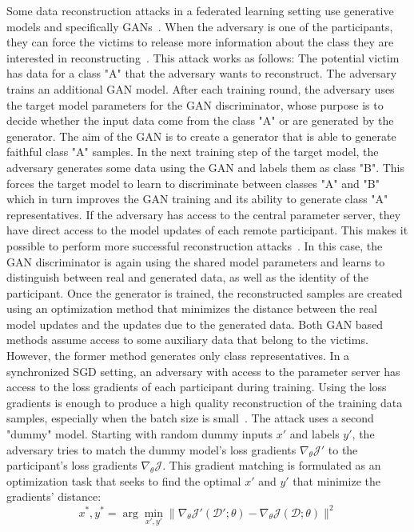 Some data reconstruction attacks in a federated learning setting use generative models and specifically GANs~. When the adversary is one of the participants, they can force the victims to release more information about the class they are interested in reconstructing~. This attack works as follows: The potential victim has data for a class "A" that the adversary wants to reconstruct. The adversary trains an additional GAN model. After each training round, the adversary uses the target model parameters for the GAN discriminator, whose purpose is to decide whether the input data come from the class "A" or are generated by the generator. The aim of the GAN is to create a generator that is able to generate faithful class "A" samples. In the next training step of the target model, the adversary generates some data using the GAN and labels them as class "B". This forces the target model to learn to discriminate between classes "A" and "B" which in turn improves the GAN training and its ability to generate class "A" representatives.
If the adversary has access to the central parameter server, they have direct access to the model updates of each remote participant. This makes it possible to perform more successful reconstruction attacks~. In this case, the GAN discriminator is again using the shared model parameters and learns to distinguish between real and generated data, as well as the identity of the participant. Once the generator is trained, the reconstructed samples are created using an optimization method that minimizes the distance between the real model updates and the updates due to the generated data. Both GAN based methods assume access to some auxiliary data that belong to the victims. However, the former method generates only class representatives.   
In a synchronized SGD setting, an adversary with access to the parameter server has access to the loss gradients of each participant during training. Using the loss gradients is enough to produce a high quality reconstruction of the training data samples, especially when the batch size is small~. The attack uses a second "dummy" model. Starting with random dummy inputs $x'$ and labels $y'$, the adversary tries to match the dummy model's loss gradients $\nabla_{\theta} \mathcal{J'}$ to the participant's loss gradients $\nabla_{\theta} \mathcal{J}$. This gradient matching is formulated as an optimization task that seeks to find the optimal $x'$ and $y'$ that minimize the gradients' distance:
\begin{equation}
    \label{eq:zhu}
    x^*, y^* = \arg\min_{x',y'} \| \nabla_{\theta} \mathcal{J'}(\mathcal{D'};\theta) - \nabla_{\theta} \mathcal{J}(\mathcal{D};\theta) \|^2
\end{equation}
